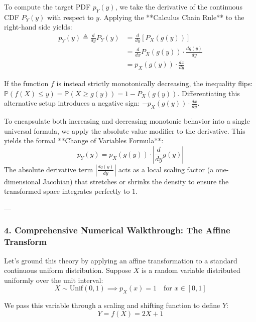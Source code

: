 \documentclass{article}
\begin{document}
To compute the target PDF $p_Y(y)$, we take the derivative of the continuous CDF $P_Y(y)$ with respect to $y$. Applying the **Calculus Chain Rule** to the right-hand side yields:
\begin{align*}
p_Y(y) \triangleq \frac{d}{dy} P_Y(y) &= \frac{d}{dy} \left[ P_X(g(y)) \right] \\
&= \frac{d}{dx} P_X(g(y)) \cdot \frac{dg(y)}{dy} \\
&= p_X(g(y)) \cdot \frac{dx}{dy}
\end{align*}

If the function $f$ is instead strictly monotonically decreasing, the inequality flips: $\mathbb{P}(f(X) \le y) = \mathbb{P}(X \ge g(y)) = 1 - P_X(g(y))$. Differentiating this alternative setup introduces a negative sign: $-p_X(g(y)) \cdot \frac{dx}{dy}$. 

To encapsulate both increasing and decreasing monotonic behavior into a single universal formula, we apply the absolute value modifier to the derivative. This yields the formal **Change of Variables Formula**:
\begin{equation}
p_Y(y) = p_X(g(y)) \cdot \left| \frac{d}{dy} g(y) \right| \tag{215}
\end{equation}
The absolute derivative term $\left| \frac{dg(y)}{dy} \right|$ acts as a local scaling factor (a one-dimensional Jacobian) that stretches or shrinks the density to ensure the transformed space integrates perfectly to $1$.

---

\subsubsection*{4. Comprehensive Numerical Walkthrough: The Affine Transform}

Let's ground this theory by applying an affine transformation to a standard continuous uniform distribution. Suppose $X$ is a random variable distributed uniformly over the unit interval:
\begin{equation*}
X \sim \text{Unif}(0, 1) \implies p_X(x) = 1 \quad \text{for } x \in [0, 1]
\end{equation*}

We pass this variable through a scaling and shifting function to define $Y$:
\begin{equation*}
Y = f(X) = 2X + 1
\end{equation*}
\end{document}
